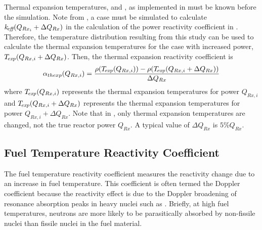     Thermal expansion temperatures, \texpfuel and \texpstruct, as implemented in
     must be known before the simulation. Note from
    , a case must be simulated to
    calculate $k_{\!\mbox{\scriptsize \em eff}}(Q_{Rx_i} + \Delta Q_{Rx})$ in the calculation of the power
    reactivity coefficient in . Therefore, 
    the temperature distribution resulting from this study can be used to
    calculate the thermal expansion temperatures for the case with increased
    power, ${{T_{\!\mbox{\scriptsize \em exp}}}(Q_{Rx,i} + \Delta Q_{Rx})}$. Then, the thermal expansion
    reactivity coefficient is 
    \begin{equation}
      \label{eq:thermal_expansion_reactivity_coefficient}
      \alpha_{thexp}(Q_{Rx,i}) = \frac{\rho({T_{\!\mbox{\scriptsize \em exp}}}(Q_{Rx,i})) - 
        \rho({T_{\!\mbox{\scriptsize \em exp}}}(Q_{Rx,i} + \Delta Q_{Rx}))}
        {\Delta Q_{Rx}}
    \end{equation}
    where ${T_{\!\mbox{\scriptsize \em exp}}}(Q_{Rx,i})$ represents the thermal expansion temperatures for
    power $Q_{Rx,i}$ and ${T_{\!\mbox{\scriptsize \em exp}}}(Q_{Rx,i} + \Delta Q_{Rx})$ represents the
    thermal expansion temperatures for power $Q_{Rx,i} + \Delta Q_{Rx}$. Note
    that in , only thermal
    expansion temperatures are changed, not the true reactor power $Q_{Rx}$.
    A typical value of $\Delta Q_{Rx}$ is $5\% Q_{Rx}$.

  \subsection{Fuel Temperature Reactivity Coefficient}
  \label{sec:fuel_temperature_reactivity_coefficient}
    The fuel temperature reactivity coefficient measures the reactivity change 
    due to an increase in fuel temperature. This coefficient is often termed the
    Doppler coefficient because the reactivity effect is due to the Doppler
    broadening of resonance absorption peaks in heavy nuclei such as
     \cite{textbookknief}. Briefly, at high fuel temperatures, 
    neutrons are more likely to be parasitically absorbed by non-fissile nuclei
    than fissile nuclei in the fuel material.

